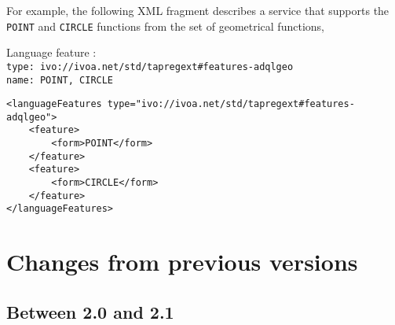 \documentclass[11pt,a4paper]{ivoa}
\begin{document}
For example, the following XML fragment describes a service that supports the
\verb:POINT: and \verb:CIRCLE: functions from the set of geometrical functions,

{\footnotesize Language feature :}\\
{\footnotesize \verb|type: ivo://ivoa.net/std/tapregext#features-adqlgeo|}\\
{\footnotesize \verb|name: POINT, CIRCLE|}\\

\begin{verbatim}
<languageFeatures type="ivo://ivoa.net/std/tapregext#features-adqlgeo">
    <feature>
        <form>POINT</form>
    </feature>
    <feature>
        <form>CIRCLE</form>
    </feature>
</languageFeatures>
\end{verbatim}

\clearpage %
\section{Changes from previous versions}
\label{sec:changes}

\subsection{Between 2.0 and 2.1}
\label{sec:changes-2.1}
\end{document}

